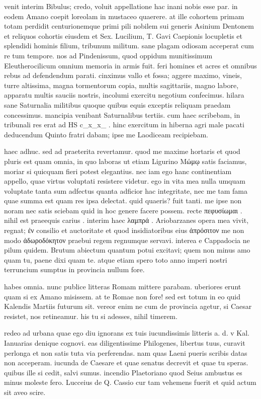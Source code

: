  venit interim Bibulus; credo, voluit appellatione hac inani nobis esse par. in eodem Amano coepit loreolam in mustaceo quaerere. at ille cohortem primam totam perdidit centurionemque primi pili nobilem sui generis Asinium Dentonem et reliquos cohortis eiusdem et Sex. Lucilium, T. Gavi Caepionis locupletis et splendidi hominis filium, tribunum militum. sane plagam odiosam acceperat cum re tum tempore. nos ad Pindenissum, quod oppidum munitissimum Eleutherocilicum omnium memoria in armis fuit. feri homines et acres et omnibus rebus ad defendendum parati. cinximus vallo et fossa; aggere maximo, vineis, turre altissima, magna tormentorum copia, multis sagittariis, magno labore, apparatu multis sauciis nostris, incolumi exercitu negotium confecimus. hilara sane Saturnalia militibus quoque quibus equis exceptis reliquam praedam concessimus. mancipia venibant Saturnalibus tertiis. cum haec scribebam, in tribunali res erat ad HS c_x_x_ . hinc exercitum in hiberna agri male pacati deducendum Quinto fratri dabam; ipse me Laodiceam recipiebam.

 haec adhuc. sed ad praeterita revertamur. quod me maxime hortaris et quod pluris est quam omnia, in quo laboras ut etiam Ligurino Μώμῳ satis faciamus, moriar si quicquam fieri potest elegantius. nec iam ego hanc continentiam appello, quae virtus voluptati resistere videtur. ego in vita mea nulla umquam voluptate tanta sum adfectus quanta adficior hac integritate, nec me tam fama quae summa est quam res ipsa delectat. quid quaeris? fuit tanti. me ipse non noram nec satis sciebam quid in hoc genere facere possem. recte πεφυσίωμαι . nihil est praeequis carius . interim haec λαμπρά . Ariobarzanes opera mea vivit, regnat; ἐν consilio et auctoritate et quod insidiatoribus eius ἀπρόσιτον me non modo ἀδωροδόκητον praebui regem regnumque servavi. interea e Cappadocia ne pilum quidem. Brutum abiectum quantum potui excitavi; quem non minus amo quam tu, paene dixi quam te. atque etiam spero toto anno imperi nostri terruncium sumptus in provincia nullum fore.

 habes omnia. nunc publice litteras Romam mittere parabam. uberiores erunt quam si ex Amano misissem. at te Romae non fore! sed est totum in eo quid Kalendis Martiis futurum sit. vereor enim ne cum de provincia agetur, si Caesar resistet, nos retineamur. his tu si adesses, nihil timerem.

 redeo ad urbana quae ego diu ignorans ex tuis iucundissimis litteris a. d. v Kal. Ianuarias denique cognovi. eas diligentissime Philogenes, libertus tuus, curavit perlonga et non satis tuta via perferendas. nam quas Laeni pueris scribis datas non acceperam. iucunda de Caesare et quae senatus decrevit et quae tu speras. quibus ille si cedit, salvi sumus. incendio Plaetoriano quod Seius ambustus es minus moleste fero. Lucceius de Q. Cassio cur tam vehemens fuerit et quid actum sit aveo scire.

